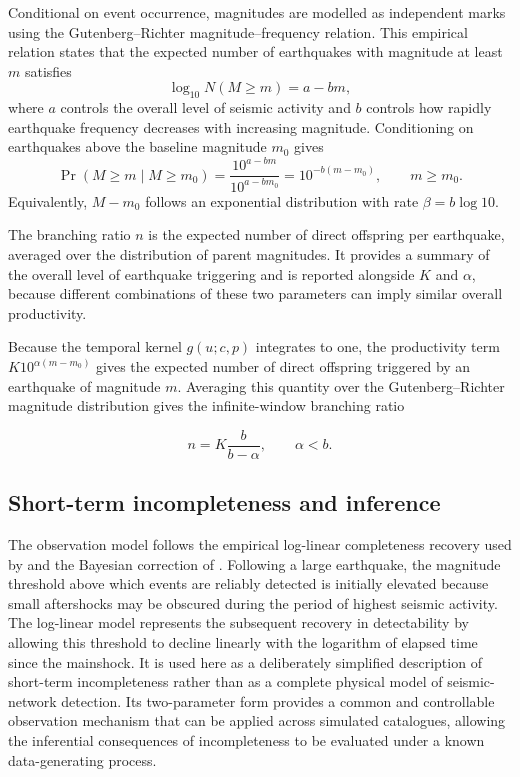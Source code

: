 \documentclass{statsmsc}
\begin{document}
Conditional on event occurrence, magnitudes are modelled as independent marks
using the Gutenberg--Richter magnitude--frequency relation. This empirical
relation states that the expected number of earthquakes with magnitude at
least \(m\) satisfies
\[
\log_{10}N(M\geq m)=a-bm,
\]
where \(a\) controls the overall level of seismic activity and \(b\) controls
how rapidly earthquake frequency decreases with increasing magnitude.
Conditioning on earthquakes above the baseline magnitude \(m_0\) gives
\[
\Pr(M\geq m\mid M\geq m_0)
=
\frac{10^{a-bm}}{10^{a-bm_0}}
=
10^{-b(m-m_0)},
\qquad m\geq m_0.
\]
Equivalently, \(M-m_0\) follows an exponential distribution with rate
\(\beta=b\log 10\).

The branching ratio \(n\) is the expected number of direct offspring per
earthquake, averaged over the distribution of parent magnitudes. It provides a
summary of the overall level of earthquake triggering and is reported
alongside \(K\) and \(\alpha\), because different combinations of these two
parameters can imply similar overall productivity.

Because the temporal kernel \(g(u;c,p)\) integrates to one, the productivity
term \(K10^{\alpha(m-m_0)}\) gives the expected number of direct offspring
triggered by an earthquake of magnitude \(m\). Averaging this quantity over
the Gutenberg--Richter magnitude distribution gives the infinite-window
branching ratio

\[
n
=
K\frac{b}{b-\alpha},
\qquad \alpha<b.
\]

\subsection{Short-term incompleteness and inference}
\label{subsec:loglinear_incompleteness}

The observation model follows the empirical log-linear completeness recovery
used by \citet{helmstetter2006} and the Bayesian correction of
\citet{kamranzad2025}. Following a large earthquake, the magnitude threshold
above which events are reliably detected is initially elevated because small
aftershocks may be obscured during the period of highest seismic activity. The
log-linear model represents the subsequent recovery in detectability by
allowing this threshold to decline linearly with the logarithm of elapsed time
since the mainshock. It is used here as a deliberately simplified description
of short-term incompleteness rather than as a complete physical model of
seismic-network detection. Its two-parameter form provides a common and
controllable observation mechanism that can be applied across simulated
catalogues, allowing the inferential consequences of incompleteness to be
evaluated under a known data-generating process.
\end{document}
